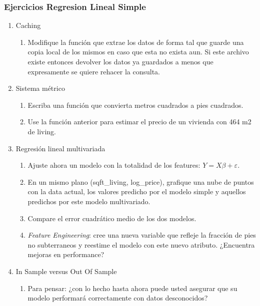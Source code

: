 \documentclass[leqno, 10pt, envcountsect]{beamer}
\numberwithin{equation}{section}
\theoremstyle{definition}
\theoremstyle{example}
\numberwithin{figure}{section}
\numberwithin{table}{section}
\let\olditem\item
\renewcommand{\item}{%
\olditem\vspace{1pt}}
\begin{document}
\begin{frame}
  \frametitle{Ejercicios Regresion Lineal Simple}
  \begin{enumerate}
    \item Caching
      \begin{enumerate}
        \item Modifique la función que extrae los datos de forma tal que guarde
          una copia local de los  mismos en caso que esta no exista aun. Si
          este archivo existe entonces devolver los datos ya guardados a menos
          que expresamente se quiere rehacer la consulta.
      \end{enumerate}
    \item Sistema métrico
      \begin{enumerate}
        \item Escriba una función que convierta metros cuadrados a pies
          cuadrados.
        \item Use la función anterior para estimar el precio de un vivienda con
          464 m2 de living.
      \end{enumerate}
    \item Regresión lineal multivariada
    \begin{enumerate}
      \item Ajuste ahora un modelo con la totalidad de los features: $Y =
        X\beta + \varepsilon$.
      \item En un mismo plano (sqft\_living, log\_price), grafique una nube de
        puntos con la data actual, los valores predicho por el modelo simple y
        aquellos predichos por este modelo multivariado.
      \item Compare el error cuadrático medio de los dos modelos.
      \item \textit{Feature Engineering}: cree una nueva variable que refleje la
        fracción de pies no subterraneos y reestime el modelo con este nuevo
        atributo. ¿Encuentra mejoras en performance?
    \end{enumerate}
    \item In Sample versus Out Of Sample
      \begin{enumerate}
        \item Para pensar: ¿con lo hecho hasta ahora puede usted asegurar que su
          modelo performará correctamente con datos desconocidos?
      \end{enumerate}
  \end{enumerate}
\end{frame}
\end{document}
